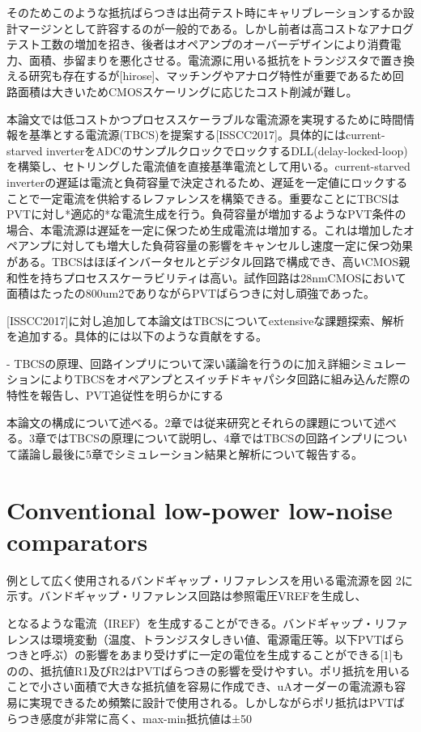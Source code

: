 \documentclass[letterpaper, 10 pt, conference]{ieeeconf}  %
\begin{document}
そのためこのような抵抗ばらつきは出荷テスト時にキャリブレーションするか設計マージンとして許容するのが一般的である。しかし前者は高コストなアナログテスト工数の増加を招き、後者はオペアンプのオーバーデザインにより消費電力、面積、歩留まりを悪化させる。電流源に用いる抵抗をトランジスタで置き換える研究も存在するが[hirose]、マッチングやアナログ特性が重要であるため回路面積は大きいためCMOSスケーリングに応じたコスト削減が難し。

本論文では低コストかつプロセススケーラブルな電流源を実現するために時間情報を基準とする電流源(TBCS)を提案する[ISSCC2017]。具体的にはcurrent-starved inverterをADCのサンプルクロックでロックするDLL(delay-locked-loop)を構築し、セトリングした電流値を直接基準電流として用いる。current-starved inverterの遅延は電流と負荷容量で決定されるため、遅延を一定値にロックすることで一定電流を供給するレファレンスを構築できる。重要なことにTBCSはPVTに対し*適応的*な電流生成を行う。負荷容量が増加するようなPVT条件の場合、本電流源は遅延を一定に保つため生成電流は増加する。これは増加したオペアンプに対しても増大した負荷容量の影響をキャンセルし速度一定に保つ効果がある。TBCSはほぼインバータセルとデジタル回路で構成でき、高いCMOS親和性を持ちプロセススケーラビリティは高い。試作回路は28nmCMOSにおいて面積はたったの800um2でありながらPVTばらつきに対し頑強であった。

[ISSCC2017]に対し追加して本論文はTBCSについてextensiveな課題探索、解析を追加する。具体的には以下のような貢献をする。

- TBCSの原理、回路インプリについて深い議論を行うのに加え詳細シミュレーションによりTBCSをオペアンプとスイッチドキャパシタ回路に組み込んだ際の特性を報告し、PVT追従性を明らかにする

本論文の構成について述べる。2章では従来研究とそれらの課題について述べる。3章ではTBCSの原理について説明し、4章ではTBCSの回路インプリについて議論し最後に5章でシミュレーション結果と解析について報告する。

\section{Conventional low-power low-noise comparators}
例として広く使用されるバンドギャップ・リファレンスを用いる電流源を図 2に示す。バンドギャップ・リファレンス回路は参照電圧VREFを生成し、


となるような電流（IREF）を生成することができる。バンドギャップ・リファレンスは環境変動（温度、トランジスタしきい値、電源電圧等。以下PVTばらつきと呼ぶ）の影響をあまり受けずに一定の電位を生成することができる[1]ものの、抵抗値R1及びR2はPVTばらつきの影響を受けやすい。ポリ抵抗を用いることで小さい面積で大きな抵抗値を容易に作成でき、uAオーダーの電流源も容易に実現できるため頻繁に設計で使用される。しかしながらポリ抵抗はPVTばらつき感度が非常に高く、max-min抵抗値は±50%
\end{document}
